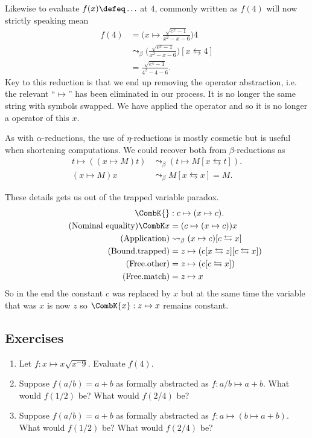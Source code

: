 Likewise to evaluate $f(x)\defeq \ldots$ at $4$, commonly written as $f(4)$ will 
now strictly speaking mean
\begin{align*}
    f(4) & = \biggl(x\mapsto \frac{\sqrt{e^x-1}}{x^2-x-6}\biggr)4 \\
     & \leadsto_{\beta} \biggl(\frac{\sqrt{e^x-1}}{x^2-x-6}\biggr)[x\leftrightarrows 4]\\
    & =\frac{\sqrt{e^4-1}}{4^2-4-6}.
\end{align*}
Key to this reduction is that we end up removing the operator abstraction, i.e.
the relevant ``$\mapsto$'' has been eliminated in our process.  It is no longer
the same string with symbols swapped.  We have applied the operator and so it 
is no longer a operator of this $x$.

As with $\alpha$-reductions, the use of $\eta$-reductions is mostly cosmetic 
but is useful when shortening computations.  We could recover both from
$\beta$-reductions as 
\begin{align*}
    t\mapsto ((x\mapsto M)t) & \leadsto_{\beta} (t\mapsto M[x\leftrightarrows t]).\\
    (x\mapsto M)x & \leadsto_{\beta} M[x\leftrightarrows x]=M.
\end{align*}


These details
gets us out of the trapped variable paradox.
\begin{align*}
    \CombK{} &: c  \mapsto (x\mapsto c).\\
    \tag{Nominal equality}
    \CombK x & = (c\mapsto (x\mapsto c))x\\
    \tag{Application}
        & \leadsto_{\beta} (x\mapsto c)[c\leftrightarrows x]\\
    \tag{Bound.trapped}
        & = z\mapsto (c[x\leftrightarrows z][c\leftrightarrows x])\\
    \tag{Free.other}
        & = z\mapsto (c[c\leftrightarrows x])\\
    \tag{Free.match}
        & = z\mapsto x
\end{align*}
So in the end the constant $c$ was replaced by $x$ but at the same time 
the variable that was $x$ is now $z$ so $\CombK{x}:z\mapsto x$ remains constant.

\subsection{Exercises}
\begin{enumerate}
    \item Let $f:x\mapsto x\sqrt{x^-9}$.  Evaluate $f(4)$.

    \item Suppose $f(a/b)=a+b$ as formally abstracted as $f:a/b\mapsto a+b$.  What would $f(1/2)$ be?
    What would $f(2/4)$ be? 

    \item Suppose $f(a/b)=a+b$ as formally abstracted as $f:a\mapsto (b\mapsto a+b)$.  What would $f(1/2)$ be?
    What would $f(2/4)$ be?  

\end{enumerate}